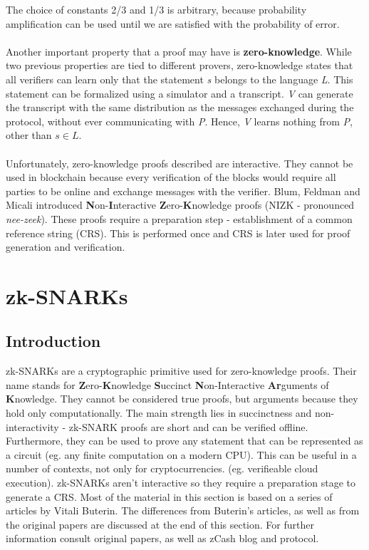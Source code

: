 The choice of constants 2/3 and 1/3 is arbitrary, because probability amplification can be used until we are satisfied with the probability of error.\\
\\
Another important property that a proof may have is \textbf{zero-knowledge}. While two previous properties are tied to different provers, zero-knowledge states that all verifiers can learn only that the statement \textit{s} belongs to the language \textit{L}. This statement can be formalized using a simulator and a transcript. \textit{V} can generate the transcript with the same distribution as the messages exchanged during the protocol, without ever communicating with \textit{P}. Hence, \textit{V} learns nothing from \textit{P}, other than $s \in L$.\\
\\
Unfortunately, zero-knowledge proofs described are interactive. They cannot be used in blockchain because every verification of the blocks would require all parties to be online and exchange messages with the verifier. Blum, Feldman and Micali \cite{blum1988non} introduced \textbf{N}on-\textbf{I}nteractive \textbf{Z}ero-\textbf{K}nowledge proofs (NIZK - pronounced \textit{nee-zeek}). These proofs require a preparation step - establishment of a common reference string (CRS). This is performed once and CRS is later used for proof generation and verification.

\section{zk-SNARKs}

\subsection{Introduction}
zk-SNARKs are a cryptographic primitive used for zero-knowledge proofs. Their name stands for \textbf{Z}ero-\textbf{K}nowledge \textbf{S}uccinct \textbf{N}on-Interactive \textbf{Ar}guments of \textbf{K}nowledge. They cannot be considered true proofs, but arguments because they hold only computationally. The main strength lies in succinctness and non-interactivity - zk-SNARK proofs are short and can be verified offline. Furthermore, they can be used to prove any statement that can be represented as a circuit (eg. any finite computation on a modern CPU). This can be useful in a number of contexts, not only for cryptocurrencies. (eg. verifieable cloud execution). zk-SNARKs aren't interactive so they require a preparation stage to generate a CRS. Most of the material in this section is based on a series of articles by Vitali Buterin. The differences from Buterin's articles, as well as from the original papers are discussed at the end of this section.  For further information consult original papers, as well as zCash blog and protocol. %

